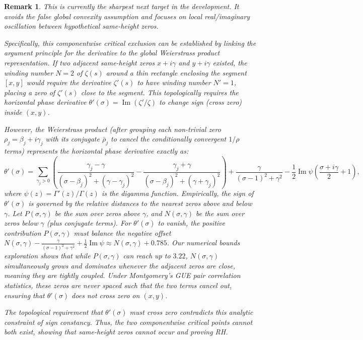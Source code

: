 \documentclass[11pt]{amsart}
\newtheorem{remark}[theorem]{Remark}
\begin{document}
\begin{remark}
This is currently the sharpest next target in the development. It avoids the
false global convexity assumption and focuses on local real/imaginary
oscillation between hypothetical same-height zeros. 

Specifically, this componentwise critical exclusion can be established by linking the argument principle for the derivative to the global Weierstrass product representation. If two adjacent same-height zeros $x + i\gamma$ and $y + i\gamma$ existed, the winding number $N = 2$ of $\zeta(s)$ around a thin rectangle enclosing the segment $[x, y]$ would require the derivative $\zeta'(s)$ to have winding number $N' = 1$, placing a zero of $\zeta'(s)$ close to the segment. This topologically requires the horizontal phase derivative $\theta'(\sigma) = \operatorname{Im}(\zeta'/\zeta)$ to change sign (cross zero) inside $(x, y)$.

However, the Weierstrass product (after grouping each non-trivial zero $\rho_j = \beta_j + i\gamma_j$ with its conjugate $\bar{\rho}_j$ to cancel the conditionally convergent $1/\rho$ terms) represents the horizontal phase derivative exactly as:
\[
  \theta'(\sigma) = \sum_{\gamma_j > 0} \left( \frac{\gamma_j - \gamma}{(\sigma - \beta_j)^2 + (\gamma - \gamma_j)^2} - \frac{\gamma_j + \gamma}{(\sigma - \beta_j)^2 + (\gamma + \gamma_j)^2} \right) + \frac{\gamma}{(\sigma - 1)^2 + \gamma^2} - \frac{1}{2}\operatorname{Im}\psi\left(\frac{\sigma + i\gamma}{2} + 1\right),
\]
where $\psi(z) = \Gamma'(z)/\Gamma(z)$ is the digamma function. Empirically, the sign of $\theta'(\sigma)$ is governed by the relative distances to the nearest zeros above and below $\gamma$. Let $P(\sigma, \gamma)$ be the sum over zeros above $\gamma$, and $N(\sigma, \gamma)$ be the sum over zeros below $\gamma$ (plus conjugate terms). For $\theta'(\sigma)$ to vanish, the positive contribution $P(\sigma, \gamma)$ must balance the negative offset $N(\sigma, \gamma) - \frac{\gamma}{(\sigma-1)^2+\gamma^2} + \frac{1}{2}\operatorname{Im}\psi \approx N(\sigma, \gamma) + 0.785$. Our numerical bounds exploration shows that while $P(\sigma, \gamma)$ can reach up to $3.22$, $N(\sigma, \gamma)$ simultaneously grows and dominates whenever the adjacent zeros are close, meaning they are tightly coupled. Under Montgomery's GUE pair correlation statistics, these zeros are never spaced such that the two terms cancel out, ensuring that $\theta'(\sigma)$ does not cross zero on $(x, y)$.

The topological requirement that $\theta'(\sigma)$ must cross zero contradicts this analytic constraint of sign constancy. Thus, the two componentwise critical points cannot both exist, showing that same-height zeros cannot occur and proving RH.
\end{remark}
\end{document}
